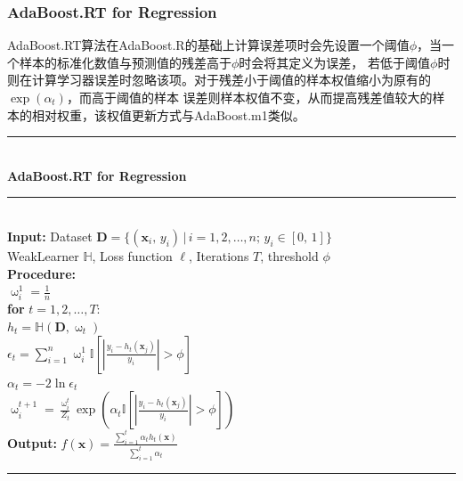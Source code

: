 \documentclass[a4paper]{article}
\begin{document}
		\subsubsection{AdaBoost.RT for Regression}
		AdaBoost.RT算法在AdaBoost.R的基础上计算误差项时会先设置一个阈值$\phi$，当一个样本的标准化数值与预测值的残差高于$\phi$时会将其定义为误差，
		若低于阈值$\phi$时则在计算学习器误差时忽略该项。对于残差小于阈值的样本权值缩小为原有的$\exp(\alpha_t)$，而高于阈值的样本
		误差则样本权值不变，从而提高残差值较大的样本的相对权重，该权值更新方式与AdaBoost.m1类似。\\
		\noindent\rule[0.1\baselineskip]{\textwidth}{0.75pt}\\
			\textbf{AdaBoost.RT for Regression}\\
			\noindent\rule[0.1\baselineskip]{\textwidth}{0.5pt}\\
			\textbf{Input:}	Dataset $\textbf{D} = \{(\textbf{x}_i,\,y_i)\,|\,i = 1, 2,\dots, n;\, y_i \in [0,\,1]\}$\\
			\hspace*{32pt}	WeakLearner $\mathbb{H}$, Loss function $\ell$, Iterations $T$, threshold $\phi$\\
			\textbf{Procedure:} \\
					\hspace*{32pt} $\upomega^1_i = \frac{1}{n}$\\
					\hspace*{32pt} \textbf{for} $t = 1, 2,\dots, T$:\\
							\hspace*{48pt} $h_t = \mathbb{H}(\textbf{D}, \upomega_t)$\\
							\hspace*{48pt} $\epsilon_t = \sum_{i=1}^{n}\upomega^1_i\mathbb{I}\left[\left|\frac{y_i-h_t(\textbf{x}_j)}{y_i}\right|>\phi\right]$\\
							\hspace*{48pt} $\alpha_t = -2\ln\epsilon_t$\\
							\hspace*{48pt} $\upomega_i^{t+1} = \frac{\upomega_i^t}{Z_t}\exp\left(\alpha_t\mathbb{I}\left[\left|\frac{y_i-h_t(\textbf{x}_j)}{y_i}\right|>\phi\right]\right)$\\
			\textbf{Output:} $f(\textbf{x}) = \frac{\sum_{i=1}^t\alpha_th_t(\textbf{x})}{\sum_{i=1}^{t}\alpha_t}$\\
			\noindent\rule[0.1\baselineskip]{\textwidth}{0.75pt}
\end{document}

